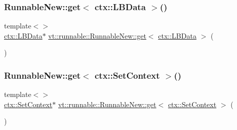 \subsubsection{\texorpdfstring{Runnable\+New\+::get$<$ ctx\+::\+L\+B\+Data $>$()}{RunnableNew::get< ctx::LBData >()}}
{\footnotesize\ttfamily template$<$$>$ \\
\hyperlink{structvt_1_1ctx_1_1_l_b_data}{ctx\+::\+L\+B\+Data}$\ast$ \hyperlink{structvt_1_1runnable_1_1_runnable_new_a140176f3b035d504ad1e726e3c7b09fa}{vt\+::runnable\+::\+Runnable\+New\+::get}$<$ \hyperlink{structvt_1_1ctx_1_1_l_b_data}{ctx\+::\+L\+B\+Data} $>$ (\begin{DoxyParamCaption}{ }\end{DoxyParamCaption})\hspace{0.3cm}{\ttfamily [inline]}}

\mbox{\label{namespacevt_1_1runnable_afec92e402b96766d18a24246651015f3}} 
\subsubsection{\texorpdfstring{Runnable\+New\+::get$<$ ctx\+::\+Set\+Context $>$()}{RunnableNew::get< ctx::SetContext >()}}
{\footnotesize\ttfamily template$<$$>$ \\
\hyperlink{structvt_1_1ctx_1_1_set_context}{ctx\+::\+Set\+Context}$\ast$ \hyperlink{structvt_1_1runnable_1_1_runnable_new_a140176f3b035d504ad1e726e3c7b09fa}{vt\+::runnable\+::\+Runnable\+New\+::get}$<$ \hyperlink{structvt_1_1ctx_1_1_set_context}{ctx\+::\+Set\+Context} $>$ (\begin{DoxyParamCaption}{ }\end{DoxyParamCaption})\hspace{0.3cm}{\ttfamily [inline]}}

